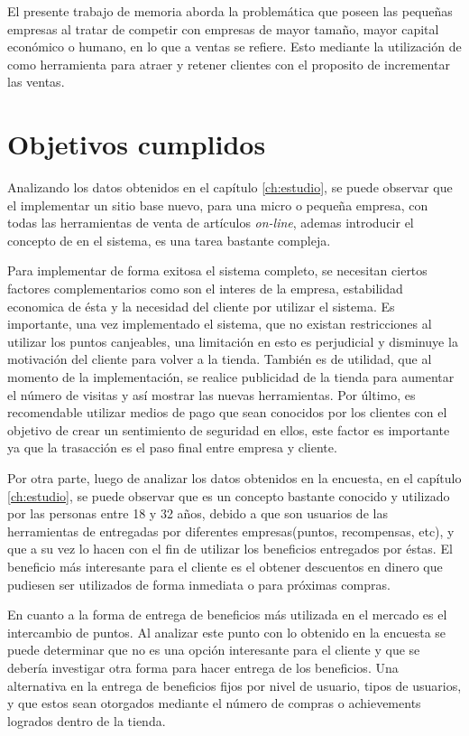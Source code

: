 El presente trabajo de memoria aborda la problemática que poseen las pequeñas
empresas al tratar de competir con empresas de mayor tamaño, mayor capital
económico o humano, en lo que a ventas se refiere. Esto mediante la utilización de {\gam} 
como herramienta para atraer y retener clientes con el proposito de incrementar las ventas.

\section{Objetivos cumplidos}

Analizando los datos obtenidos en el capítulo \ref{ch:estudio}, se puede observar que el
implementar un sitio base nuevo, para una micro o pequeña empresa, con todas las
herramientas de venta de artículos \emph{on-line}, ademas introducir el concepto de {\gam} en el sistema,
 es una tarea bastante compleja.

Para implementar de forma exitosa el sistema completo, se necesitan ciertos factores
complementarios como son el interes de la empresa, estabilidad economica de ésta y la necesidad del cliente 
por utilizar el sistema. Es importante, una vez implementado el sistema, que no existan restricciones 
al utilizar los puntos canjeables, una limitación en esto es perjudicial y disminuye la motivación del 
cliente para volver a la tienda.
También es de utilidad, que al momento de la implementación, se realice publicidad
de la tienda para aumentar el número de visitas y así mostrar las nuevas herramientas. 
Por último, es recomendable utilizar medios de pago que sean conocidos
por los clientes con el objetivo de crear un sentimiento de seguridad en ellos, este factor es importante
ya que la trasacción es el paso final entre empresa y cliente.

Por otra parte, luego de analizar los datos obtenidos en la encuesta, en el capítulo \ref{ch:estudio},
 se puede observar que {\gam} es un concepto bastante conocido y utilizado por las personas
entre 18 y 32 años, debido a que son usuarios de las herramientas de {\gam} entregadas por
diferentes empresas(puntos, recompensas, etc), y que a su vez lo hacen con el fin de utilizar los beneficios entregados
por éstas. El beneficio más interesante para el cliente es el obtener descuentos en dinero
que pudiesen ser utilizados de forma inmediata o para próximas compras.

En cuanto a la forma de entrega de beneficios más utilizada en el mercado es el intercambio de puntos.
Al analizar este punto con lo obtenido en la encuesta se puede determinar que no es
una opción interesante para el cliente y que se debería investigar otra forma para
hacer entrega de los beneficios. Una alternativa en la entrega de beneficios fijos por nivel
de usuario, tipos de usuarios,  y que estos sean otorgados mediante el número de compras o achievements logrados
dentro de la tienda.

